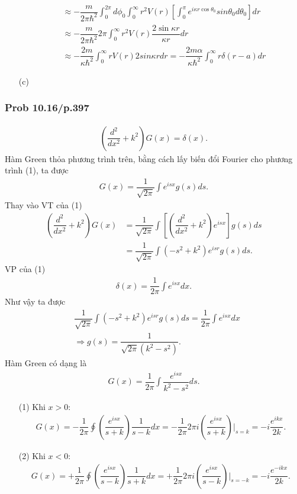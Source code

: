 \documentclass{report}
\newcommand{\f}[2]{\dfrac{#1}{#2}}
\newcommand{\at}[2]{\bigg\rvert_{#1}^{#2} }
\begin{document}
\begin{enumerate}
\begin{align*}
		       & \approx -\f{m}{2\pi \hbar^2} \int_{0}^{2\pi}d\phi_{0} \int_{0}^{\infty} r^{2} V(r) \left[\int_{0}^{\pi} e^{i\kappa r \cos\theta_{0}}sin\theta_{0} d\theta_{0}\right] dr \\
		       & \approx -\f{m}{2\pi \hbar^2} 2\pi \int_{0}^{\infty} r^{2} V(r) \f{2\sin \kappa r}{\kappa r} dr                                                                          \\
		       & \approx -\f{2m}{\kappa\hbar^2} \int_{0}^{\infty} r V(r) 2sin \kappa r dr = -\f{2m\alpha}{\kappa\hbar^2} \int_{0}^{\infty} r \delta(r-a) dr
	      \end{align*}
	\item [(c)]
\end{enumerate}

\subsubsection{Prob 10.16/p.397}
\begin{align*}
	\left( \f{d^2}{dx^2} + k^2 \right) G(x) = \delta(x).\tag{1}
\end{align*}
Hàm Green thỏa phương trình trên, bằng cách lấy biến đổi Fourier cho phương trình (1), ta được
\begin{align*}
	G(x) = \f{1}{\sqrt{2\pi}}\int e^{isx}g(s)ds.
\end{align*}
Thay vào VT của (1)
\begin{align*}
	\left( \f{d^2}{dx^2} + k^2 \right) G(x)
	 & = \f{1}{\sqrt{2\pi}}\int \left[\left( \f{d^2}{dx^2} + k^2 \right)e^{isx}\right]g(s)ds \\
	 & = \f{1}{\sqrt{2\pi}} \int \left(-s^2 + k^2\right) e^{isr} g(s) ds.
\end{align*}
VP của (1)
\begin{align*}
	\delta(x) = \f{1}{2\pi} \int e^{isx} dx.
\end{align*}
Như vậy ta được
\begin{align*}
	 & \f{1}{\sqrt{2\pi}} \int \left(-s^2 + k^2\right) e^{isr} g(s) ds = \f{1}{2\pi}  \int e^{isx} dx \\
	 & \Rightarrow g(s) = \f{1}{\sqrt{2\pi} (k^2 - s^2)}.
\end{align*}
Hàm Green có dạng là
\begin{align*}
	G(x) = \f{1}{2\pi} \int \f{e^{isx}}{k^2 - s^2} ds.
\end{align*}
\begin{enumerate}
	\item[(1)]
		Khi $x>0$:
		\begin{align*}
			G(x) = -\f{1}{2\pi}\oint \left( \f{e^{isx}}{s+k} \right)\f{1}{s-k} dx = -\f{1}{2\pi} 2\pi i \left( \f{e^{isx}}{s+k} \right) \at{s=k}{} = -i\f{e^{ikx}}{2k}.
		\end{align*}
	\item[(2)]
		Khi $x<0$:
		\begin{align*}
			G(x) = +\f{1}{2\pi}\oint \left( \f{e^{isx}}{s-k} \right)\f{1}{s+k} dx = +\f{1}{2\pi} 2\pi i \left( \f{e^{isx}}{s-k} \right) \at{s=-k}{} = -i\f{e^{-ikx}}{2k}.
		\end{align*}
\end{enumerate}
\end{document}

